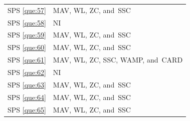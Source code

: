 \documentclass[sensors,review,accept,moreauthors,pdftex]{Definitions/mdpi}
\begin{document}
\begin{table}[H]
\begin{tabular}{m{33pt}m{370pt}}
	
	SPS \ref{que:57}	&	MAV, WL, ZC, and~SSC	\\	
	SPS \ref{que:58}	&	NI	\\	
	SPS \ref{que:59}	&	MAV, WL, ZC, and~SSC	\\	
	SPS \ref{que:60}	&	MAV, WL, ZC, and~SSC	\\	
%		
%	
%
%
	SPS \ref{que:61}	&	MAV, WL, ZC, SSC, WAMP, and~CARD	\\	
	SPS \ref{que:62}	&	NI	\\	
	SPS \ref{que:63}	&	MAV, WL, ZC, and~SSC	\\	
	SPS \ref{que:64}	&	MAV, WL, ZC, and~SSC	\\	
	SPS \ref{que:65}	&	MAV, WL, ZC, and~SSC	\\	
	
	\bottomrule
		
	\end{tabular}
	
\end{table}
	
	
	
	
	
	
\end{document}
